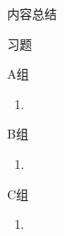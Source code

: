 \vspace{2ex} 
\centerline{\heiti \Large 内容总结}

\vspace{2ex} 

\centerline{\heiti \Large 习题}
\vspace{2ex} 
{\kaishu }
\begin{flushright}
    \kaishu

\end{flushright}
\centerline{\heiti A组}
\begin{enumerate}
	\item 
\end{enumerate}
\centerline{\heiti B组}
\begin{enumerate}
	\item 
\end{enumerate}
\centerline{\heiti C组}
\begin{enumerate}
	\item 
\end{enumerate}